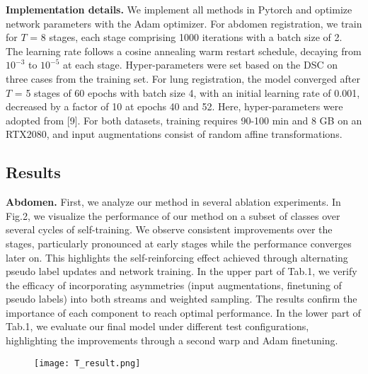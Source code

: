 \textbf{Implementation details.} We implement all methods in Pytorch and optimize network parameters with the Adam optimizer. For abdomen registration, we train for $T$ = 8 stages, each stage comprising 1000 iterations with a batch size of 2. The learning rate follows a cosine annealing warm restart schedule, decaying from $10^{-3}$ to $10^{-5}$ at each stage. Hyper-parameters were set based on the DSC on three cases from the training set. For lung registration, the model converged after $T$ = 5 stages of 60 epochs with batch size 4, with an initial learning rate of 0.001, decreased by a factor of 10 at epochs 40 and 52. Here, hyper-parameters were adopted from [9]. For both datasets, training requires 90-100 min and 8 GB on an RTX2080, and input augmentations consist of random affine transformations.

\subsection{Results}

\textbf{Abdomen. }First, we analyze our method in several ablation experiments. In Fig.2, we visualize the performance of our method on a subset of classes over several cycles of self-training. We observe consistent improvements over the stages, particularly pronounced at early stages while the performance converges later on. This highlights the self-reinforcing effect achieved through alternating pseudo label updates and network training. In the upper part of Tab.1, we verify the efficacy of incorporating asymmetries (input augmentations, finetuning of pseudo labels) into both streams and weighted sampling. The results confirm the importance of each component to reach optimal performance. In the lower part of Tab.1, we evaluate our final model under different test configurations, highlighting the improvements through a second warp and Adam finetuning.

\begin{figure}
  \centering
  \texttt{[image: T\_result.png]}
\end{figure}

